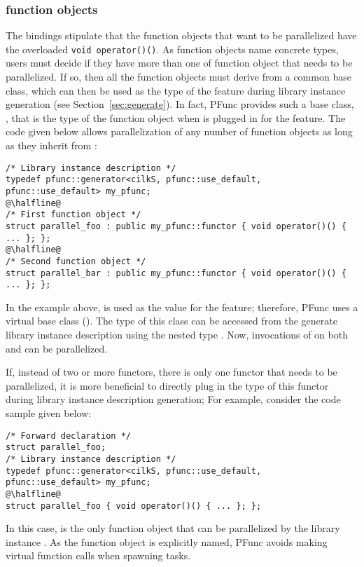 \subsubsection{\Cpp{} function objects}
%
The \Cpp{} bindings stipulate that the function objects that want to be 
parallelized have the overloaded \lstinline{void operator()()}.
%
As function objects name concrete types, users must decide if they have more
than one  of function object that needs to be parallelized. 
%
If so, then all the function objects must derive from a common base class,
which can then be used as the type of the  feature during
library instance generation (see Section~\ref{sec:generate}). 
%
In fact, PFunc provides such a base class, , that 
is the type of the function object when  is plugged
in for the  feature.
%
The code given below allows parallelization of any number of function objects
as long as they inherit from : 
%
\begin{lstlisting}
/* Library instance description */
typedef pfunc::generator<cilkS, pfunc::use_default, pfunc::use_default> my_pfunc;
@\halfline@
/* First function object */
struct parallel_foo : public my_pfunc::functor { void operator()() { ... }; };
@\halfline@
/* Second function object */
struct parallel_bar : public my_pfunc::functor { void operator()() { ... }; };
\end{lstlisting}
%
In the example above,  is used as the value for the
 feature; therefore, PFunc uses a virtual base class
().
%
The type of this class can be accessed from the generate library instance
description using the nested type . 
%
Now, invocations of  on both  and
 can be parallelized.

If, instead of two or more functors, there is only one functor that needs to 
be parallelized, it is more beneficial to directly plug in the type of this 
functor during library instance description generation; 
%
For example, consider the code sample given below:
%
\begin{lstlisting}
/* Forward declaration */
struct parallel_foo;
/* Library instance description */
typedef pfunc::generator<cilkS, pfunc::use_default, pfunc::use_default> my_pfunc;
@\halfline@
struct parallel_foo { void operator()() { ... }; };
\end{lstlisting}
%
In this case,  is the only function object that can be 
parallelized by the library instance . 
%
As the function object is explicitly named, PFunc avoids making virtual
function calls when spawning tasks. 

